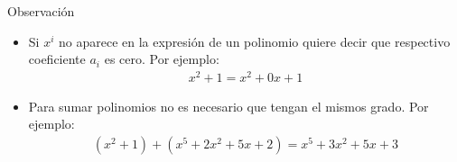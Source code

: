 \documentclass[handout]{beamer} %
\begin{document}
        
        
        
        \begin{frame}
        
 
        \begin{block}{}
        
         
         \pause
        \end{block}
        \begin{block}{Observación}
            \begin{itemize}
             \item Si $x^i$ no aparece en la expresión de un polinomio quiere decir que respectivo coeficiente $a_i$ es cero. Por ejemplo:
             \begin{align*}
             x^2+1=x^2+0x+1 
             \end{align*}\pause
            \item Para sumar polinomios no es necesario que tengan el mismos grado. Por ejemplo:
            \begin{align*}
            (x^2+1)+(x^5+2x^2+5x+2)=x^5+3x^2+5x+3
            \end{align*}
            
            
            \end{itemize}
            
            
            
            \end{block}
         
        \end{frame}
\end{document}
